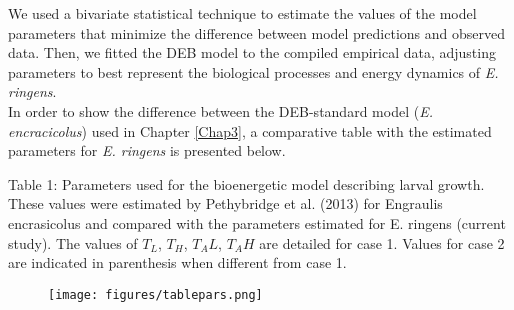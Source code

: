 We used a bivariate statistical technique \citep{Lika2011a,Lika2011b} to estimate the values of the model parameters that minimize the difference between model predictions and observed data. Then, we fitted the DEB model to the compiled empirical data, adjusting parameters to best represent the biological processes and energy dynamics of \textit{E. ringens}.\\

In order to show the difference between the DEB-standard model (\textit{E. encracicolus}) used in Chapter \ref{Chap3}, a comparative table with the estimated parameters for \textit{E. ringens} is presented below.

Table 1: Parameters used for the bioenergetic model describing larval growth. These values were estimated by Pethybridge et al. (2013) for Engraulis encrasicolus and compared with the parameters estimated for E. ringens (current study). The values of $T_L$, $T_H$, $T_AL$, $T_AH$ are detailed for case 1. Values for case 2 are indicated in parenthesis when different from case 1.

\begin{figure}[ht]
	\texttt{[image: figures/tablepars.png]}
	\centering
\end{figure}

